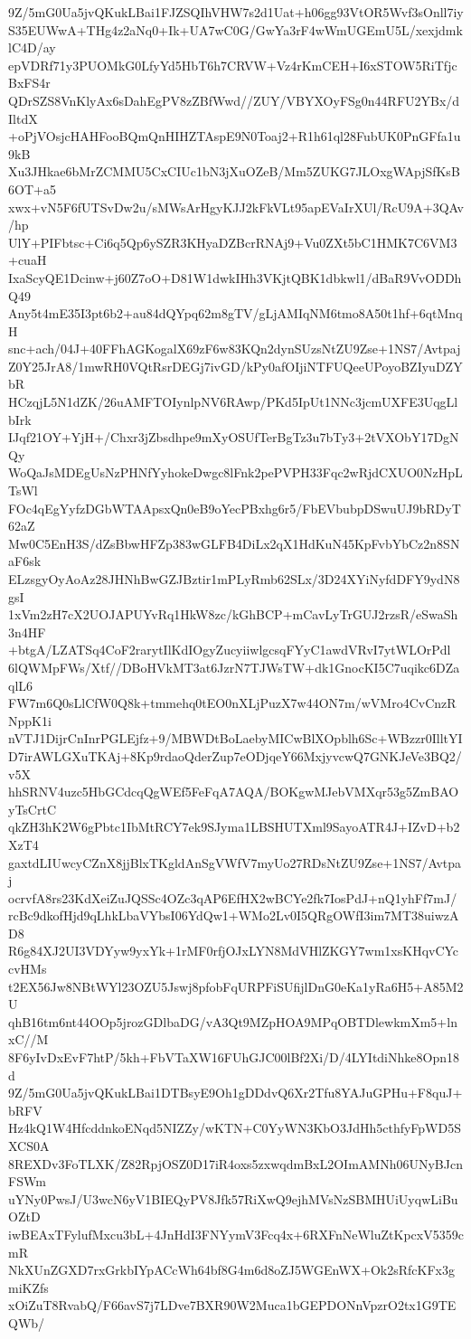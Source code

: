 9Z/5mG0Ua5jvQKukLBai1FJZSQIhVHW7s2d1Uat+h06gg93VtOR5Wvf3sOnll7iy
S35EUWwA+THg4z2aNq0+Ik+UA7wC0G/GwYa3rF4wWmUGEmU5L/xexjdmklC4D/ay
epVDRf71y3PUOMkG0LfyYd5HbT6h7CRVW+Vz4rKmCEH+I6xSTOW5RiTfjcBxFS4r
QDrSZS8VnKlyAx6sDahEgPV8zZBfWwd//ZUY/VBYXOyFSg0n44RFU2YBx/dIltdX
+oPjVOsjcHAHFooBQmQnHIHZTAspE9N0Toaj2+R1h61ql28FubUK0PnGFfa1u9kB
Xu3JHkae6bMrZCMMU5CxCIUc1bN3jXuOZeB/Mm5ZUKG7JLOxgWApjSfKsB6OT+a5
xwx+vN5F6fUTSvDw2u/sMWsArHgyKJJ2kFkVLt95apEVaIrXUl/RcU9A+3QAv/hp
UlY+PIFbtsc+Ci6q5Qp6ySZR3KHyaDZBcrRNAj9+Vu0ZXt5bC1HMK7C6VM3+cuaH
IxaScyQE1Dcinw+j60Z7oO+D81W1dwkIHh3VKjtQBK1dbkwl1/dBaR9VvODDhQ49
Any5t4mE35I3pt6b2+au84dQYpq62m8gTV/gLjAMIqNM6tmo8A50t1hf+6qtMnqH
snc+ach/04J+40FFhAGKogalX69zF6w83KQn2dynSUzsNtZU9Zse+1NS7/Avtpaj
Z0Y25JrA8/1mwRH0VQtRsrDEGj7ivGD/kPy0afOIjiNTFUQeeUPoyoBZIyuDZYbR
HCzqjL5N1dZK/26uAMFTOIynlpNV6RAwp/PKd5IpUt1NNc3jcmUXFE3UqgLlbIrk
IJqf21OY+YjH+/Chxr3jZbsdhpe9mXyOSUfTerBgTz3u7bTy3+2tVXObY17DgNQy
WoQaJsMDEgUsNzPHNfYyhokeDwgc8lFnk2pePVPH33Fqc2wRjdCXUO0NzHpLTsWl
FOc4qEgYyfzDGbWTAApsxQn0eB9oYecPBxhg6r5/FbEVbubpDSwuUJ9bRDyT62aZ
Mw0C5EnH3S/dZsBbwHFZp383wGLFB4DiLx2qX1HdKuN45KpFvbYbCz2n8SNaF6sk
ELzsgyOyAoAz28JHNhBwGZJBztir1mPLyRmb62SLx/3D24XYiNyfdDFY9ydN8gsI
1xVm2zH7cX2UOJAPUYvRq1HkW8zc/kGhBCP+mCavLyTrGUJ2rzsR/eSwaSh3n4HF
+btgA/LZATSq4CoF2rarytIlKdIOgyZucyiiwlgcsqFYyC1awdVRvI7ytWLOrPdl
6lQWMpFWs/Xtf//DBoHVkMT3at6JzrN7TJWsTW+dk1GnocKI5C7uqikc6DZaqlL6
FW7m6Q0sLlCfW0Q8k+tmmehq0tEO0nXLjPuzX7w44ON7m/wVMro4CvCnzRNppK1i
nVTJ1DijrCnInrPGLEjfz+9/MBWDtBoLaebyMICwBlXOpblh6Sc+WBzzr0IlltYI
D7irAWLGXuTKAj+8Kp9rdaoQderZup7eODjqeY66MxjyvcwQ7GNKJeVe3BQ2/v5X
hhSRNV4uzc5HbGCdcqQgWEf5FeFqA7AQA/BOKgwMJebVMXqr53g5ZmBAOyTsCrtC
qkZH3hK2W6gPbtc1IbMtRCY7ek9SJyma1LBSHUTXml9SayoATR4J+IZvD+b2XzT4
gaxtdLIUwcyCZnX8jjBlxTKgldAnSgVWfV7myUo27RDsNtZU9Zse+1NS7/Avtpaj
ocrvfA8rs23KdXeiZuJQSSc4OZc3qAP6EfHX2wBCYe2fk7IosPdJ+nQ1yhFf7mJ/
rcBc9dkofHjd9qLhkLbaVYbsI06YdQw1+WMo2Lv0I5QRgOWfI3im7MT38uiwzAD8
R6g84XJ2UI3VDYyw9yxYk+1rMF0rfjOJxLYN8MdVHlZKGY7wm1xsKHqvCYccvHMs
t2EX56Jw8NBtWYl23OZU5Jswj8pfobFqURPFiSUfijlDnG0eKa1yRa6H5+A85M2U
qhB16tm6nt44OOp5jrozGDlbaDG/vA3Qt9MZpHOA9MPqOBTDlewkmXm5+lnxC//M
8F6yIvDxEvF7htP/5kh+FbVTaXW16FUhGJC00lBf2Xi/D/4LYItdiNhke8Opn18d
9Z/5mG0Ua5jvQKukLBai1DTBsyE9Oh1gDDdvQ6Xr2Tfu8YAJuGPHu+F8quJ+bRFV
Hz4kQ1W4HfcddnkoENqd5NIZZy/wKTN+C0YyWN3KbO3JdHh5cthfyFpWD5SXCS0A
8REXDv3FoTLXK/Z82RpjOSZ0D17iR4oxs5zxwqdmBxL2OImAMNh06UNyBJcnFSWm
uYNy0PwsJ/U3wcN6yV1BIEQyPV8Jfk57RiXwQ9ejhMVsNzSBMHUiUyqwLiBuOZtD
iwBEAxTFylufMxcu3bL+4JnHdI3FNYymV3Fcq4x+6RXFnNeWluZtKpcxV5359cmR
NkXUnZGXD7rxGrkbIYpACcWh64bf8G4m6d8oZJ5WGEnWX+Ok2sRfcKFx3gmiKZfs
xOiZuT8RvabQ/F66avS7j7LDve7BXR90W2Muca1bGEPDONnVpzrO2tx1G9TEQWb/

